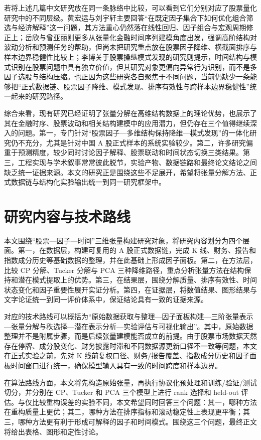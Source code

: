 若将上述几篇中文研究放在同一条脉络中比较，可以看到它们分别对应了股票量化研究中的不同层级。黄宏运与刘宇轩主要回答“在既定因子集合下如何优化组合筛选与经济解释”这一问题，其方法重心仍然落在线性回归、因子组合与宏观周期修正上；岳欣与曾亚丽则更多从张量化金融时间序列建模角度出发，强调高阶结构对波动分析和预测任务的帮助，但尚未把研究重点放在股票因子降维、横截面排序与样本边界稳健性比较上；李博关于股票操纵模式发现的研究则提示，时间结构与模式识别在股票问题中具有独立价值，但其研究对象更偏向异常行为识别，而不是多因子选股与结构压缩。也正因为这些研究各自聚焦于不同问题，当前仍缺少一条能够把“正式数据链、股票因子降维、模式发现、排序有效性与跨样本边界稳健性”统一起来的研究路径。

综合来看，现有研究已经证明了张量分解在高维结构数据上的理论优势，也展示了其在金融时序、股票波动和相关结构建模中的应用潜力，但仍存在三个值得继续深入的问题。第一，专门针对“股票因子—多维结构保持降维—模式发现”的一体化研究仍不充分，尤其是针对中国 A 股正式样本的系统实验较少。第二，许多研究偏重于预测精度，较少同时讨论因子解释、股票联动和时间状态切换三类结果。第三，工程实现与学术叙事常常彼此脱节，实验产物、数据链路和最终论文结论之间缺乏统一证据来源。本文的研究正是围绕这些不足展开，希望将张量分解方法、正式数据链与结构化实验输出统一到同一研究框架中。

\section{研究内容与技术路线}

本文围绕“股票—因子—时间”三维张量构建研究对象，将研究内容划分为四个层面。第一，在数据层，构建可复用的 A 股正式数据链，完成 K 线、财务、报告和指数成分历史等基础数据的整理，并在此基础上形成因子面板。第二，在方法层，比较 CP 分解、Tucker 分解与 PCA 三种降维路径，重点分析张量方法在结构保持和潜在模式提取上的优势。第三，在结果层，围绕分解质量、排序有效性、时间状态变化和因子重要性展开实证分析。第四，在证据层，将数值结果、图形结果与文字论证统一到同一评价体系中，保证结论具有一致的证据来源。

对应的技术路线可以概括为“原始数据获取与整理—因子面板构建—三阶张量表示—张量分解与秩选择—潜在表示分析—实验评估与可视化输出”。其中，原始数据整理并不是附属步骤，而是后续张量建模能否成立的前提。由于股票市场数据天然存在停牌、成分股变化、财务披露时滞和不同数据源更新口径不一致等问题，本文在正式实验之前，先对 K 线前复权口径、财务/报告覆盖、指数成分历史和因子面板时间窗口进行统一，确保模型输入具有一致的时间跨度和样本边界。

在算法路线方面，本文将先构造原始张量，再执行协议化预处理和训练/验证/测试切分，并分别在 CP、Tucker 和 PCA 三个模型上进行 rank 选择和 held-out 评估。与仅比较重构误差的实验不同，本文希望同时回答三个问题：其一，哪种方法在重构质量上更优；其二，哪种方法在排序指标和滚动稳定性上表现更平衡；其三，哪种方法更有利于形成可解释的因子和时间模式。围绕这三个问题，最终正文将给出表格、图形和定性讨论。

